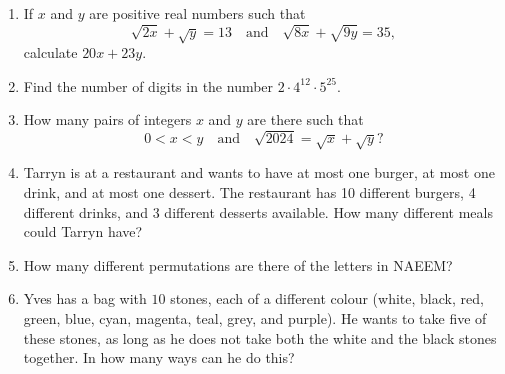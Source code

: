 \documentclass[12pt]{article}
\begin{document}
\begin{enumerate}[topsep=2\bigskipamount,itemsep=1.4\bigskipamount]
\item If $x$ and $y$ are positive real numbers such that
\[ \sqrt{2x} +\sqrt{y} = 13 \quad\text{and}\quad \sqrt{8x} +\sqrt{9y} = 35, \]
calculate $20x+23y$.

\item Find the number of digits in the number $2 \cdot 4^{12} \cdot 5^{25}$.

\item How many pairs of integers $x$ and $y$ are there such that
\[ 0 < x < y \quad\text{and}\quad \sqrt{2024} = \sqrt{x} +\sqrt{y}? \]




\item Tarryn is at a restaurant and wants to have at most one burger, at most one drink, and at most one dessert.
The restaurant has 10 different burgers, 4 different drinks, and 3 different desserts available.
How many different meals could Tarryn have?

\item How many different permutations are there of the letters in NAEEM?

\item Yves has a bag with $10$ stones, each of a different colour (white, black, red, green, blue, cyan, magenta, teal, grey, and purple).
He wants to take five of these stones, as long as he does not take both the white and the black stones together.
In how many ways can he do this?

\end{enumerate}
\end{document}
